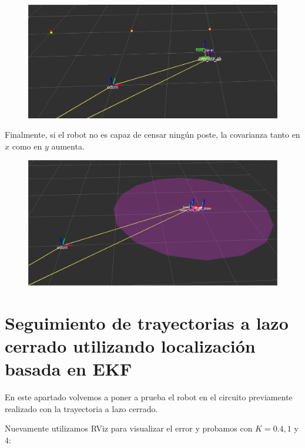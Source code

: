 \begin{figure}[!htb]
\begin{center}
\includegraphics[scale=0.3]{punto4/ekfViendoTresPostesOtraVez.png}
\end{center}
\end{figure}
\FloatBarrier

Finalmente, si el robot no es capaz de censar ningún poste, la covarianza tanto en $x$ como en $y$ aumenta.

\begin{figure}[!htb]
\begin{center}
\includegraphics[scale=0.3]{punto4/ekfSinVerNingunPoste.png}
\end{center}
\end{figure}
\FloatBarrier

\section{Seguimiento de trayectorias a lazo cerrado utilizando localización basada en EKF}

En este apartado volvemos a poner a prueba el robot en el circuito previamente realizado con la trayectoria a lazo cerrado.

Nuevamente utilizamos RViz para visualizar el error y probamos con $K= 0.4,1$ y $4$:

